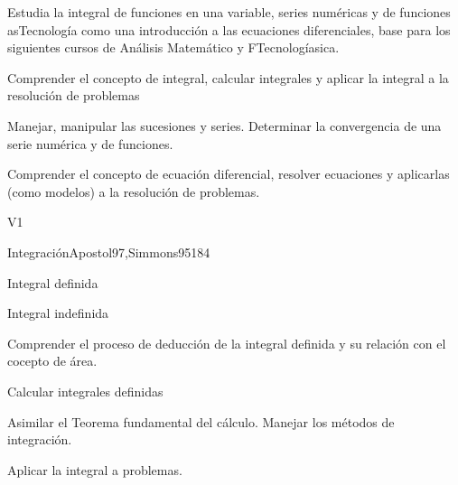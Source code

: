\begin{syllabus}


\begin{justification}
Estudia la integral de funciones en una variable, series numéricas y de funciones asTecnología como una introducción a las ecuaciones diferenciales, base para los siguientes cursos de Análisis Matemático y FTecnologíasica.
\end{justification}

\begin{goals}
\item Comprender el concepto de integral, calcular integrales y aplicar la integral a la resolución de problemas
\item Manejar, manipular las sucesiones y series. Determinar la convergencia de una serie numérica y de funciones.
\item Comprender el concepto de ecuación diferencial, resolver ecuaciones y aplicarlas (como modelos) a la resolución de problemas.
\end{goals}

\begin{outcomes}{V1}
\item {}
\item {}
\item {}
\end{outcomes}

\begin{unit}{Integración}{}{Apostol97,Simmons95}{18}{4}
   \begin{topics}
      \item Integral definida
      \item Integral indefinida
   \end{topics}

   \begin{learningoutcomes}
      \item Comprender el proceso de deducción de la integral definida y su relación con el cocepto de área.
      \item Calcular integrales definidas
      \item Asimilar el Teorema fundamental del cálculo. Manejar los métodos de integración.
      \item Aplicar la integral a problemas.
   \end{learningoutcomes}
\end{unit}


\end{syllabus}
